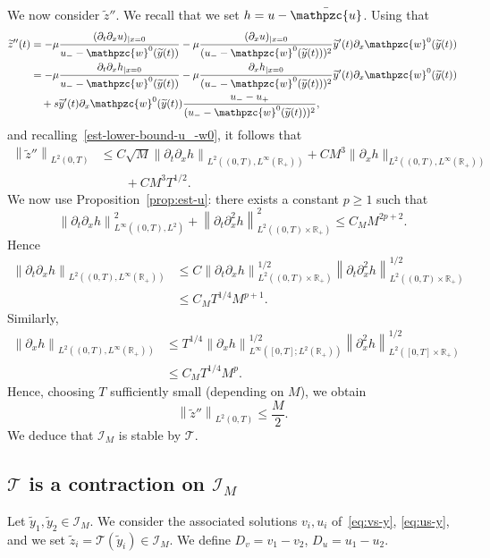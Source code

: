 \documentclass[AHL,Unicode,longabstracts,published]{cedram}
\newcommand{\R}{\mathbb{R}}
\newcommand{\p}{\partial}
\newcommand{\bu}{\bar{\mathpzc{u}}}
\newcommand{\cT}{\mathcal T}
\newcommand{\cI}{\mathcal I}
\newcommand{\tw}{\mathpzc{w}}
\newcommand{\ty}{\widetilde{y}}
\newcommand{\tz}{\widetilde{z}}
\newcommand{\dv}{D_v}
\newcommand{\du}{D_u}
\begin{document}
We now consider $\tz''$. We recall that we set $h=u-\bu$. Using that
\begin{align}\label{eq:z''}
\tz''(t) & = - \mu \frac{(\p_t \p_x u)_{|x=0}}{u_--\tw^0(\ty(t))} - \mu \frac{(\p_x u)_{|x=0}}{(u_--\tw^0(\ty(t)))^2}\ty'(t) \p_x \tw^0(\ty(t)) \nonumber \\
& = - \mu \frac{\p_t\p_xh_{|x=0}}{u_--\tw^0(\ty(t))} - \mu \frac{\p_xh_{|x=0}}{(u_--\tw^0(\ty(t)))^2}\ty'(t)\p_x \tw^0(\ty(t))\\
&\quad + s \ty'(t) \p_x \tw^0(\ty(t)) \frac{u_--u_+}{(u_--\tw^0(\ty(t)))^2},
\end{align}
and recalling~\eqref{est-lower-bound-u_-w0}, it follows that
\begin{align*}
\left\|\tz''\right\|_{L^2(0,T)} & \leq C \sqrt{M} \left\|\p_t \p_x h\right\|_{L^2((0,T), L^\infty(\R_+))} + C M^3 \| \p_x h\|_{L^2((0,T), L^\infty(\R_+))} \\
& \qquad + C M^{3} T^{1/2}.
\end{align*}
We now use Proposition~\ref{prop:est-u}: there exists a constant $p\geq 1$ such that
\[
\left\|\p_t \p_xh\right\|_{L^\infty\left((0,T), L^2\right)}^2 + \left\|\p_t\p_x^2 h\right\|_{L^2\left((0,T)\times \R_+\right)}^2 \leq C_M M^{2p+2}.
\]
Hence
\begin{align*}
\left\|\p_t \p_x h\right\|_{L^2\left((0,T), L^\infty(\R_+)\right)} & \leq C\left\|\p_t \p_x h\right\|_{L^2\left((0,T) \times \R_+\right)}^{1/2} \left\|\p_t \p^2_x h\right\|_{L^2\left((0,T) \times \R_+\right)}^{1/2} \\
& \leq C_M T^{1/4} M^{p+1}.
\end{align*}
Similarly,
\begin{align*}
\left\| \p_x h\right\|_{L^2\left((0,T), L^\infty(\R_+)\right)} & \leq T^{1/4} \left\|\p_xh\right\|_{L^\infty\left([0,T];L^2(\R_+)\right)}^{1/2} \left\|\p_x^2h\right\|_{L^2\left([0,T]\times \R_+\right)}^{1/2} \\
& \leq C_M T^{1/4} M^p.
\end{align*}
Hence, choosing $T$ sufficiently small (depending on $M$), we obtain
\[
\left\|\tz''\right\|_{L^2(0,T)}\leq \frac{M}{2}.
\]
We deduce that $\cI_M$ is stable by $\cT$.


\subsection{\texorpdfstring{$\cT$}{T} is a contraction on \texorpdfstring{$\cI_M$}{IM}}
Let $\ty_1, \ty_2\in \cI_M$. We consider the associated solutions $v_{i}, u_{i}$ of~\eqref{eq:vs-y}, \eqref{eq:us-y}, and we set $\tz_i=\cT(\ty_i)\in \cI_M$. We define $\dv=v_1-v_2$, $\du=u_1-u_2$.
\end{document}
